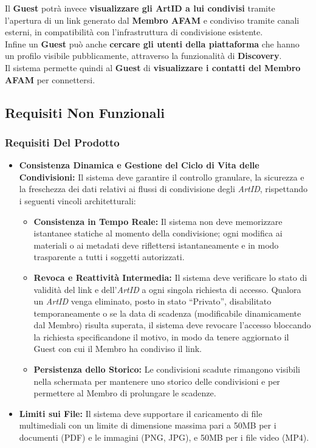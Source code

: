 Il \textbf{Guest} potrà invece \textbf{visualizzare gli ArtID a lui condivisi} tramite l'apertura di un link generato dal \textbf{Membro AFAM} e condiviso tramite canali esterni, in compatibilità con l'infrastruttura di condivisione esistente.\\
Infine un \textbf{Guest} può anche \textbf{cercare gli utenti della piattaforma} che hanno un profilo visibile pubblicamente, attraverso la funzionalità di \textbf{Discovery}.\\
Il sistema permette quindi al \textbf{Guest} di \textbf{visualizzare i contatti del Membro AFAM} per connettersi.\\


\subsection{Requisiti Non Funzionali}


\subsubsection{Requisiti Del Prodotto}
\begin{itemize}
    \item \textbf{Consistenza Dinamica e Gestione del Ciclo di Vita delle Condivisioni:} Il sistema deve garantire il controllo granulare, la sicurezza e la freschezza dei dati relativi ai flussi di condivisione degli \textit{ArtID}, rispettando i seguenti vincoli architetturali:
\begin{itemize}
    \item \textbf{Consistenza in Tempo Reale:} Il sistema non deve memorizzare istantanee statiche al momento della condivisione; ogni modifica ai materiali o ai metadati deve riflettersi istantaneamente e in modo trasparente a tutti i soggetti autorizzati.
    \item \textbf{Revoca e Reattività Intermedia:} Il sistema deve verificare lo stato di validità del link e dell'\textit{ArtID} a ogni singola richiesta di accesso. Qualora un \textit{ArtID} venga eliminato, posto in stato ``Privato'', disabilitato temporaneamente o se la data di scadenza (modificabile dinamicamente dal Membro) risulta superata, il sistema deve revocare l'accesso bloccando la richiesta specificandone il motivo, in modo da tenere aggiornato il Guest con cui il Membro ha condiviso il link.
    \item \textbf{Persistenza dello Storico:} Le condivisioni scadute rimangono visibili nella schermata per mantenere uno storico delle condivisioni e per permettere al Membro di prolungare le scadenze.

\end{itemize}
    \item \textbf{Limiti sui File:} Il sistema deve supportare il caricamento di file multimediali con un limite di dimensione massima pari a 50MB per i documenti (PDF) e le immagini (PNG, JPG), e 50MB per i file video (MP4).
\end{itemize}


